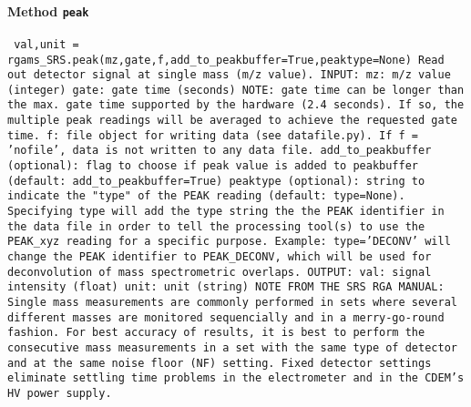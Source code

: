 \paragraph{Method \texttt{peak}}
\vspace{1ex}
\texttt{\newline
val,unit = rgams_SRS.peak(mz,gate,f,add_to_peakbuffer=True,peaktype=None)\newline
\newline
Read out detector signal at single mass (m/z value).\newline
\newline
INPUT:\newline
mz: m/z value (integer)\newline
gate: gate time (seconds) NOTE: gate time can be longer than the max. gate time supported by the hardware (2.4 seconds). If so, the multiple peak readings will be averaged to achieve the requested gate time.\newline
f: file object for writing data (see datafile.py). If f = 'nofile', data is not written to any data file.\newline
add_to_peakbuffer (optional): flag to choose if peak value is added to peakbuffer (default: add_to_peakbuffer=True)\newline
peaktype (optional): string to indicate the "type" of the PEAK reading (default: type=None). Specifying type will add the type string the the PEAK identifier in the data file in order to tell the processing tool(s) to use the PEAK_xyz reading for a specific purpose. Example: type='DECONV' will change the PEAK identifier to PEAK_DECONV, which will be used for deconvolution of mass spectrometric overlaps.\newline
\newline
OUTPUT:\newline
val: signal intensity (float)\newline
unit: unit (string)\newline
\newline
NOTE FROM THE SRS RGA MANUAL:\newline
Single mass measurements are commonly performed in sets\newline
where several different masses are monitored sequencially\newline
and in a merry-go-round fashion.\newline
For best accuracy of results, it is best to perform the consecutive\newline
mass measurements in a set with the same type of detector\newline
and at the same noise floor (NF) setting.\newline
Fixed detector settings eliminate settling time problems\newline
in the electrometer and in the CDEM's HV power supply.\newline
\newline
}

